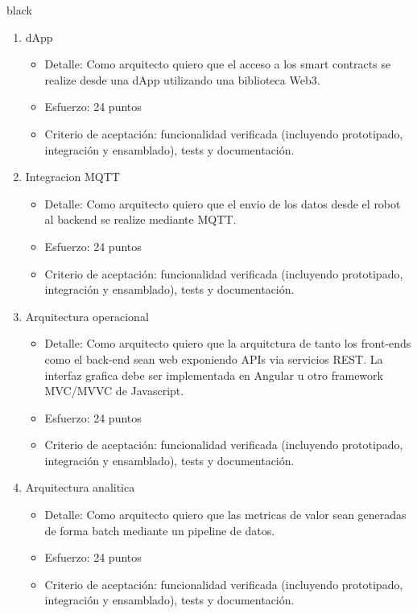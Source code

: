 \documentclass[
11pt, %
]{charter}
\begin{document}
\begin{consigna}{black}
\begin{enumerate}
	\item dApp
	\begin{itemize}
		\item Detalle: Como arquitecto quiero que el acceso a los smart contracts se realize desde una dApp utilizando una biblioteca Web3.
		\item Esfuerzo: 24 puntos
		\item Criterio de aceptación: funcionalidad verificada (incluyendo prototipado, integración y ensamblado), tests y documentación.
	\end{itemize}
	
	\item Integracion MQTT
	\begin{itemize}
		\item Detalle: Como arquitecto quiero que el envio de los datos desde el robot al backend se realize mediante MQTT.
		\item Esfuerzo: 24 puntos
		\item Criterio de aceptación: funcionalidad verificada (incluyendo prototipado, integración y ensamblado), tests y documentación.
	\end{itemize}


	\item Arquitectura operacional
	\begin{itemize}
		\item Detalle: Como arquitecto quiero que la arquitctura de tanto los front-ends como el back-end sean web exponiendo APIs via servicios REST. La interfaz grafica debe ser implementada en Angular u otro framework MVC/MVVC de Javascript.
		\item Esfuerzo: 24 puntos
		\item Criterio de aceptación: funcionalidad verificada (incluyendo prototipado, integración y ensamblado), tests y documentación.
	\end{itemize}

	\item Arquitectura analitica
	\begin{itemize}
		\item Detalle: Como arquitecto quiero que las metricas de valor sean generadas de forma batch mediante un pipeline de datos.
		\item Esfuerzo: 24 puntos
		\item Criterio de aceptación: funcionalidad verificada (incluyendo prototipado, integración y ensamblado), tests y documentación.
	\end{itemize}


\end{enumerate}
\end{consigna}
\end{document}
